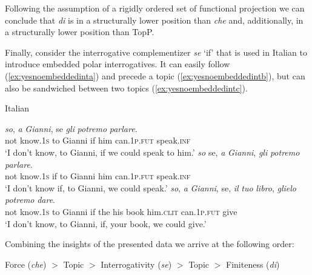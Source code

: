 \noindent Following the assumption of a rigidly ordered set of functional projection we can conclude that \textit{di} is in a structurally lower position than \textit{che} and, additionally, in a structurally lower position than TopP.

Finally, consider the interrogative complementizer \textit{se} `if' that is used in Italian to introduce embedded polar interrogatives. It can easily follow (\ref{ex:yesnoembeddedinta}) and precede a topic (\ref{ex:yesnoembeddedintb}), but can also be sandwiched between two topics (\ref{ex:yesnoembeddedintc}).

\begin{exe}
\ex Italian \citep[205]{rizzi2013notes} \label{yesnoembeddedint}\begin{xlist}
\ex {} {\textit{so},} {\textit{a}} {\textit{Gianni},} {se} {\textit{gli}} {\textit{potremo}} {\textit{parlare}.}  \\
{not} {know.\textsc{1s}} {to} {Gianni} {if} {him} {can.\textsc{1p.fut}} {speak.\textsc{inf}} \\
\trans `I don't know, to Gianni, if we could speak to him.' \label{ex:yesnoembeddedinta}
\ex {} {\textit{so}} {se,} {\textit{a}} {\textit{Gianni},} {\textit{gli}} {\textit{potremo}} {\textit{parlare}.}  \\
{not} {know.\textsc{1s}} {if} {to} {Gianni} {him} {can.\textsc{1p.fut}} {speak.\textsc{inf}} \\
\trans `I don’t know if, to Gianni, we could speak.' \label{ex:yesnoembeddedintb}
\ex {} {\textit{so},} {\textit{a}} {\textit{Gianni},} {se,} {\textit{il}} {\textit{tuo}} {\textit{libro},} {\textit{glielo}} {\textit{potremo}} {\textit{dare}.}  \\
{not} {know.\textsc{1s}} {to} {Gianni} {if} {the} {his} {book} {him.\textsc{clit}} {can.\textsc{1p.fut}} {give} \\
\trans `I don’t know, to Gianni, if, your book, we could give.' \label{ex:yesnoembeddedintc}
\end{xlist}
\end{exe}


\noindent Combining the insights of the presented data we arrive at the following order:

\begin{exe}
\ex Force (\textit{che}) $>$ Topic $>$ Interrogativity (\textit{se}) $>$ Topic $>$ Finiteness (\textit{di})
\end{exe}

